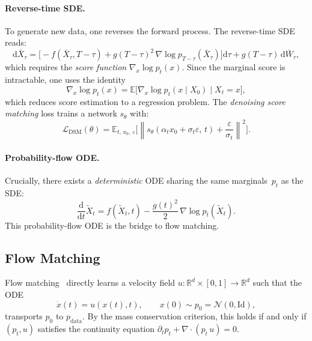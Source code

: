 \documentclass[10pt,a4paper]{article}
\theoremstyle{definition}
\newcommand{\R}{\mathbb{R}}
\newcommand{\E}{\mathbb{E}}
\newcommand{\cN}{\mathcal{N}}
\newcommand{\cL}{\mathcal{L}}
\newcommand{\dd}{\mathrm{d}}
\newcommand{\norm}[1]{\left\lVert #1 \right\rVert}
\newcommand{\Id}{\mathrm{Id}}
\begin{document}
\paragraph{Reverse-time SDE.}
To generate new data, one reverses the forward process.
The reverse-time SDE reads:
\begin{equation}\label{eq:reverse-sde}
    \dd \bar{X}_\tau = \Big[-f(\bar{X}_\tau, T-\tau) + g(T-\tau)^2\,\nabla\log p_{T-\tau}(\bar{X}_\tau)\Big]\dd\tau + g(T-\tau)\,\dd\bar{W}_\tau,
\end{equation}
which requires the \emph{score function} $\nabla_x \log p_t(x)$.
Since the marginal score is intractable, one uses the identity
\begin{equation}\label{eq:score-cond}
    \nabla_x \log p_t(x) = \E\!\big[\nabla_x \log p_t(x \mid X_0) \;\big|\; X_t = x\big],
\end{equation}
which reduces score estimation to a regression problem.
The \emph{denoising score matching} loss trains a network $s_\theta$ with:
\[
    \cL_{\mathrm{DSM}}(\theta) = \E_{t,\,x_0,\,\varepsilon}\!\Big[\norm{s_\theta(\alpha_t x_0 + \sigma_t \varepsilon,\, t) + \frac{\varepsilon}{\sigma_t}}^2\Big].
\]

\paragraph{Probability-flow ODE.}
Crucially, there exists a \emph{deterministic} ODE sharing the same marginals~$p_t$ as the SDE:
\begin{equation}\label{eq:pf-ode}
    \frac{\dd}{\dd t}\tilde{X}_t = f(\tilde{X}_t, t) - \frac{g(t)^2}{2}\,\nabla\log p_t(\tilde{X}_t).
\end{equation}
This probability-flow ODE is the bridge to flow matching.

\subsection{Flow Matching}\label{subsec:fm}

Flow matching~\cite{lipman2023flow} directly learns a velocity field $u:\R^d\times[0,1]\to\R^d$ such that the ODE
\begin{equation}\label{eq:fm-ode}
    \dot{x}(t) = u(x(t), t), \qquad x(0) \sim p_0 = \cN(0, \Id),
\end{equation}
transports $p_0$ to $p_{\mathrm{data}}$.
By the mass conservation criterion, this holds if and only if $(p_t, u)$ satisfies the continuity equation $\partial_t p_t + \nabla\cdot(p_t\, u) = 0$.
\end{document}
